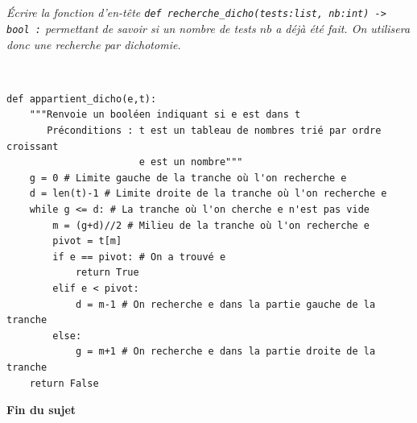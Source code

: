 \documentclass[10pt,fleqn]{article} %
\begin{document}
\subparagraph{}
\textit{Écrire la fonction d’en-tête \texttt{def recherche\_dicho(tests:list, nb:int) -> bool :} permettant de savoir si un nombre de tests $nb$ a déjà été fait. On utilisera donc une recherche par dichotomie.}
\ifprof
\begin{corrige}~\\


\begin{lstlisting}
def appartient_dicho(e,t):
    """Renvoie un booléen indiquant si e est dans t
       Préconditions : t est un tableau de nombres trié par ordre croissant
                       e est un nombre"""
    g = 0 # Limite gauche de la tranche où l'on recherche e
    d = len(t)-1 # Limite droite de la tranche où l'on recherche e
    while g <= d: # La tranche où l'on cherche e n'est pas vide
        m = (g+d)//2 # Milieu de la tranche où l'on recherche e
        pivot = t[m] 
        if e == pivot: # On a trouvé e
            return True
        elif e < pivot: 
            d = m-1 # On recherche e dans la partie gauche de la tranche
        else:
            g = m+1 # On recherche e dans la partie droite de la tranche
    return False
\end{lstlisting}
    
\end{corrige}
\else
\fi



\ifprof
\else
\vfill
\begin{center}
\textbf{	Fin du sujet	}
\end{center}
\vfill
\fi
\end{document}
